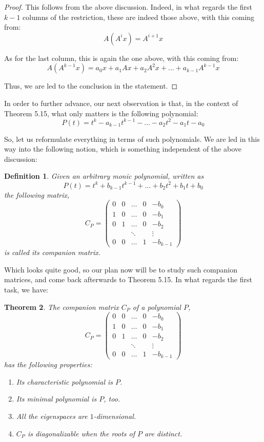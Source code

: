 \documentclass[12pt]{amsbook}
\newtheorem{theorem}{Theorem}[chapter]
\newtheorem{definition}[theorem]{Definition}
\begin{document}
\begin{proof}
This follows from the above discussion. Indeed, in what regards the first $k-1$ columns of the restriction, these are indeed those above, with this coming from:
$$A(A^ix)=A^{i+1}x$$

As for the last column, this is again the one above, with this coming from:
$$A(A^{k-1}x)=a_0x+a_1Ax+a_2A^2x+\ldots+a_{k-1}A^{k-1}x$$

Thus, we are led to the conclusion in the statement.
\end{proof}

In order to further advance, our next observation is that, in the context of Theorem 5.15, what only matters is the following polynomial:
$$P(t)=t^k-a_{k-1}t^{k-1}-\ldots-a_2t^2-a_1t-a_0$$

So, let us reformulate everything in terms of such polynomials. We are led in this way into the following notion, which is something independent of the above discussion:

\begin{definition}
Given an arbitrary monic polynomial, written as
$$P(t)=t^k+b_{k-1}t^{k-1}+\ldots+b_2t^2+b_1t+b_0$$
the following matrix,
$$C_P=\begin{pmatrix}
0&0&\ldots&0&-b_0\\
1&0&\ldots&0&-b_1\\
0&1&\ldots&0&-b_2\\
&&\ddots&&\vdots\\
0&0&\ldots&1&-b_{k-1}
\end{pmatrix}$$
is called its companion matrix.
\end{definition}

Which looks quite good, so our plan now will be to study such companion matrices, and come back afterwards to Theorem 5.15. In what regards the first task, we have:

\begin{theorem}
The companion matrix $C_P$ of a polynomial $P$,
$$C_P=\begin{pmatrix}
0&0&\ldots&0&-b_0\\
1&0&\ldots&0&-b_1\\
0&1&\ldots&0&-b_2\\
&&\ddots&&\vdots\\
0&0&\ldots&1&-b_{k-1}
\end{pmatrix}$$
has the following properties:
\begin{enumerate}
\item Its characteristic polynomial is $P$.

\item Its minimal polynomial is $P$, too.

\item All the eigenspaces are $1$-dimensional.

\item $C_P$ is diagonalizable when the roots of $P$ are distinct.
\end{enumerate}
\end{theorem}
\end{document}

